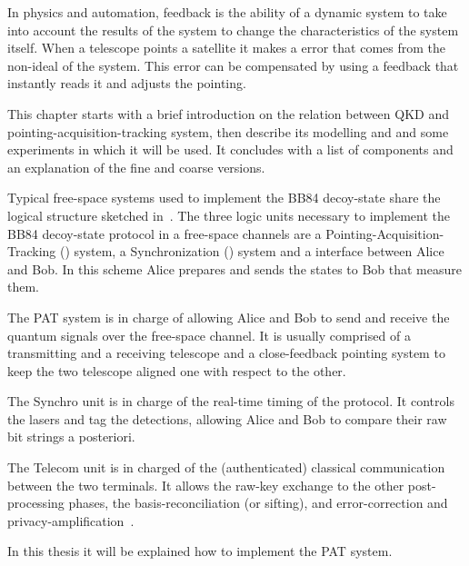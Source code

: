 In physics and automation, feedback is the ability of a dynamic system to take into account the results of the system to change the characteristics of the system itself. When a telescope points a satellite it makes a error that comes from the non-ideal of the system. This error can be compensated by using a feedback that instantly reads it and adjusts the pointing.

This chapter starts with a brief introduction on the relation between QKD and pointing-acquisition-tracking system, then describe its modelling and and some experiments in which it will be used. It concludes with a list of components and an explanation of the fine and coarse versions.


Typical free-space systems used to implement the BB84 decoy-state share the logical structure sketched in~. The three logic units necessary to implement the BB84 decoy-state protocol in a free-space channels are a Pointing-Acquisition-Tracking () system, a Synchronization () system and a  interface between Alice and Bob. In this scheme  Alice prepares and sends the states to Bob that measure them.

The PAT system is in charge of allowing Alice and Bob to send and receive the quantum signals over the free-space channel. It is usually comprised of a transmitting and a receiving telescope and a close-feedback pointing system to keep the two telescope aligned one with respect to the other.

The Synchro unit is in charge of the real-time timing of the protocol. It controls the lasers and tag the detections, allowing Alice and Bob to compare their raw bit strings a posteriori.

The Telecom unit is in charged of the (authenticated) classical communication between the two terminals. It allows the raw-key exchange to the other post-processing phases, the basis-reconciliation (or sifting), and error-correction and privacy-amplification~\cite{a9}.

In this thesis it will be explained how to implement the PAT system.

